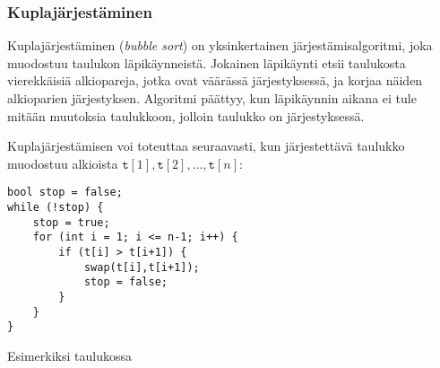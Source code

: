\begin{center}
\end{center}

\subsubsection{Kuplajärjestäminen}


Kuplajärjestäminen (\textit{bubble sort})
on yksinkertainen järjestämisalgoritmi,
joka muodostuu taulukon läpikäynneistä.
Jokainen läpikäynti etsii taulukosta
vierekkäisiä alkiopareja,
jotka ovat väärässä järjestyksessä,
ja korjaa näiden alkioparien järjestyksen.
Algoritmi päättyy, kun läpikäynnin
aikana ei tule mitään muutoksia taulukkoon,
jolloin taulukko on järjestyksessä.

Kuplajärjestämisen voi toteuttaa seuraavasti,
kun järjestettävä taulukko muodostuu alkioista
$\texttt{t}[1],\texttt{t}[2],\ldots,\texttt{t}[n]$:
\begin{lstlisting}
bool stop = false;
while (!stop) {
    stop = true;
    for (int i = 1; i <= n-1; i++) {
        if (t[i] > t[i+1]) {
            swap(t[i],t[i+1]);
            stop = false;
        }
    }
}
\end{lstlisting}

\noindent
Esimerkiksi taulukossa

\begin{center}
\end{center}

